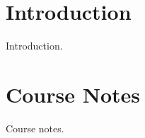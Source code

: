 \mainmatter%
\setcounter{page}{1}

\lectureseries[\course]{\course}

\date{Lecture Date}

\setaddress%

\setcounter{lecture}{0}
\setcounter{chapter}{0}


\section{Introduction}
Introduction.

\section{Course Notes}
Course notes.
